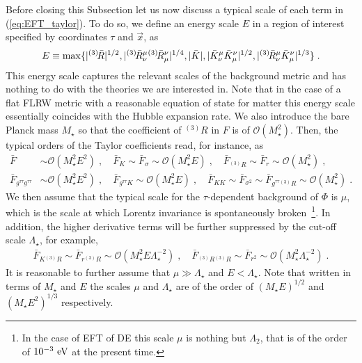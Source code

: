 \documentclass[a4paper,11pt]{article}
\numberwithin{equation}{section}
\begin{document}
Before closing this Subsection let us now discuss a typical scale of each term in (\ref{eq:EFT_taylor}). To do so, we define an energy scale $E$ in a region of interest specified by coordinates $\tau$ and $\vec{x}$, as 
\begin{align}\label{eq:energy_E}
E \equiv {\rm max}\{|{}^{(3)}\!\bar{R}|^{1/2} , |{}^{(3)}\!\bar{R}^{\mu}_{\nu}{}^{(3)}\!\bar{R}^{\nu}_{\mu}|^{1/4} , |\bar{K}| , |\bar{K}^{\mu}_{\nu}\bar{K}^{\nu}_{\mu}|^{1/2} , |{}^{(3)}\!\bar{R}^{\mu}_{\nu}\bar{K}^{\nu}_{\mu}|^{1/3}\} \;.
 \end{align}
This energy scale captures the relevant scales of the background metric and has nothing to do with the theories we are interested in. Note that in the case of a flat FLRW metric with a reasonable equation of state for matter this energy scale essentially coincides with the Hubble expansion rate. We also introduce the bare Planck mass $M_\star$  so that the coefficient of ${}^{(3)}\! R$ in $F$ is of $\mathcal{O}(M_\star^2)$. Then, the typical orders of the Taylor coefficients read, for instance, as
 \begin{align}
 \bar{F} &\sim \mathcal{O}(M_\star^2 E^2) \;, \quad  \bar{F}_{K} \sim \bar{F}_{\sigma}  \sim \mathcal{O}(M_\star^2 E) \;, \quad \bar{F}_{{}^{(3)}\!R} \sim \bar{F}_{r}  \sim \mathcal{O}(M_\star^2) \;, \label{eq:scaling1} \\ 
 \bar{F}_{g^{\tau\tau}g^{\tau\tau}} &\sim \mathcal{O}(M_\star^2 E^2) \;, \quad \bar{F}_{g^{\tau\tau}K} \sim \mathcal{O}(M_\star^2 E) \;, \quad \bar{F}_{KK} \sim \bar{F}_{\sigma^2} \sim  \bar{F}_{g^{\tau\tau}{}^{(3)}\!R} \sim \mathcal{O}(M_\star^2) \;. \label{eq:scaling2}
  \end{align}
We then assume that the typical scale for the $\tau$-dependent background of $\Phi$ is $\mu$, which is the scale at which Lorentz invariance is spontaneously broken~\footnote{In the case of EFT of DE this scale $\mu$ is nothing but $\Lambda_2$, that is of the order of $10^{-3}~{\rm eV}$ at the present time.}. In addition, the higher derivative terms will be further suppressed by the cut-off scale $\Lambda_\star$, for example,
 \begin{align}
 \bar{F}_{K{}^{(3)}\!R} \sim \bar{F}_{r{}^{(3)}\!R} \sim \mathcal{O}(M_\star^2 E \Lambda_\star^{-2}) \;, \quad  \bar{F}_{{}^{(3)}\!R{}^{(3)}\!R} \sim \bar{F}_{r^2} \sim \mathcal{O}(M_\star^2 \Lambda_\star^{-2}) \;. \label{eq:scaling3}
 \end{align} 
It is reasonable to further assume that $\mu \gg \Lambda_\star$ and $E < \Lambda_\star$.  Note that written in terms of $M_\star$ and $E$ the scales $\mu$ and $\Lambda_\star$ are of the order of $(M_\star E)^{1/2}$ and $(M_\star E^2)^{1/3}$ respectively.
\end{document}
